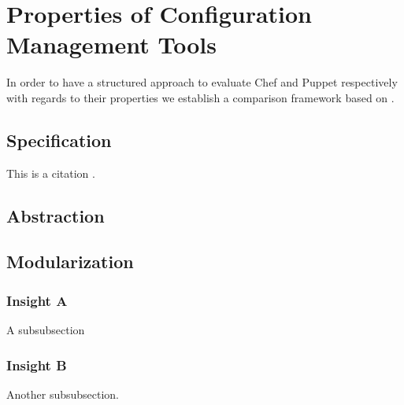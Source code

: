 \section{Properties of Configuration Management Tools}

In order to have a structured approach to evaluate Chef and Puppet respectively with regards to their properties we establish a comparison framework based on \cite{delaet2010survey}. 




\subsection{Specification}

This is a citation \cite{Lamport:LaTeX}.

\subsection{Abstraction}

\subsection{Modularization}


\subsubsection{Insight A}

A subsubsection

\subsubsection{Insight B}
Another subsubsection.